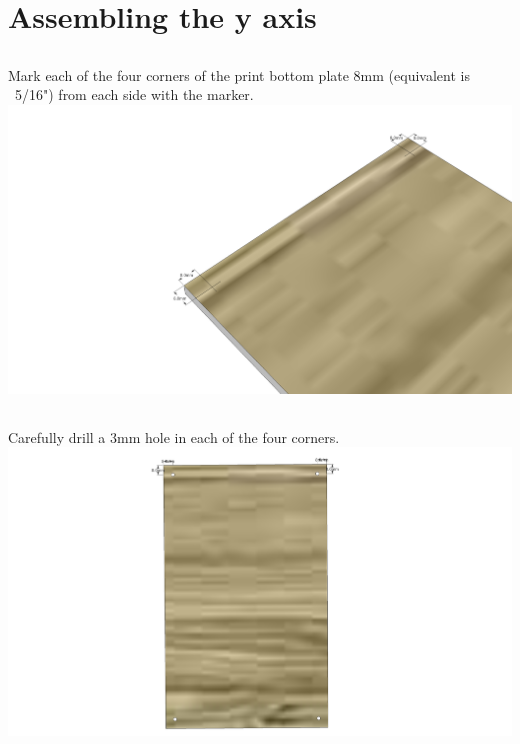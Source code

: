 \documentclass[twoside,a4paper,titlepage]{memoir}
\begin{document}
	\chapter{Assembling the y axis}
	
	\section{}
	Mark each of the four corners of the print bottom plate 8mm (equivalent is ~5/16") from each side with
	the marker.\\
	\includegraphics[width=1\linewidth]{graphics/ch6_1.png}
	
	\section{}
	Carefully drill a 3mm hole in each of the four corners.\\
	\includegraphics[width=1\linewidth]{graphics/ch6_2.png}
	
\end{document}
